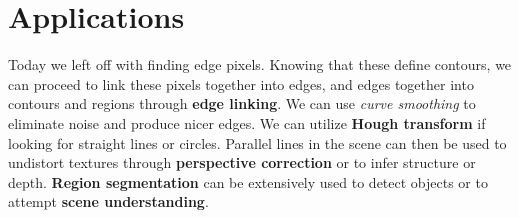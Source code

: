 \documentclass{article}
\begin{document}
\section{Applications}
Today we left off with finding edge pixels. Knowing that these define contours, we can proceed to link these pixels together into edges, and edges together into contours and regions through \textbf{edge linking}. We can use \textit{curve smoothing} to eliminate noise and produce nicer edges. We can utilize \textbf{Hough transform} if looking for straight lines or circles. Parallel lines in the scene can then be used to undistort textures through \textbf{perspective correction} or to infer structure or depth. \textbf{Region segmentation} can be extensively used to detect objects or to attempt \textbf{scene understanding}.
\end{document}
